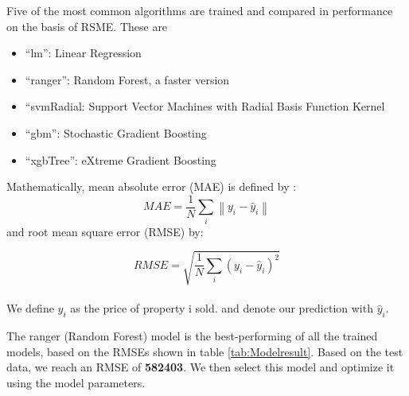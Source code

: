 \documentclass[
]{article}
\providecommand{\tightlist}{%
  \setlength{\itemsep}{0pt}\setlength{\parskip}{0pt}}
\begin{document}
Five of the most common algorithms are trained and compared in performance on the basis of RSME. These are

\begin{itemize}
\tightlist
\item
  ``lm'': Linear Regression
\item
  ``ranger'': Random Forest, a faster version
\item
  ``svmRadial: Support Vector Machines with Radial Basis Function Kernel
\item
  ``gbm'': Stochastic Gradient Boosting
\item
  ``xgbTree'': eXtreme Gradient Boosting
\end{itemize}

Mathematically, mean absolute error (MAE) is defined by :
\begin{equation} 
    MAE = \frac{1}{N}\sum_{i}\left\| y_{i}-\hat{y}_{i}\right\|
  \label{eq:metricMAE}
\end{equation}
and root mean square error (RMSE) by:

\begin{equation} 
    RMSE = \sqrt{\frac{1}{N}\sum_{i}\left(y_{i}-\hat{y}_{i}\right)^{2}}
  \label{eq:metricRMSE}
\end{equation}\\
We define \(y_{i}\) as the price of property i sold. and denote our prediction with \(\hat{y}_{i}\).

The ranger (Random Forest) model is the best-performing of all the trained models, based on the RMSEs shown in table \ref{tab:Modelresult}. Based on the test data, we reach an RMSE of \textbf{582403}. We then select this model and optimize it using the model parameters.

\begin{table}[H]
\centering
\caption{\label{tab:Modelresult}Performance of each algorithm based on different metrics.}
\centering
{}
\end{table}
\end{document}
